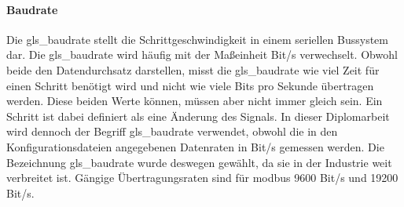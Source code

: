 \paragraph{Baudrate} \label{baud_rate}
Die \gls{gls_baudrate} stellt die Schrittgeschwindigkeit in einem seriellen Bussystem dar. Die \gls{gls_baudrate} wird häufig mit der Maßeinheit Bit/s verwechselt. Obwohl beide den Datendurchsatz darstellen, misst die \gls{gls_baudrate} wie viel Zeit für einen Schritt benötigt wird und nicht wie viele Bits pro Sekunde übertragen werden. Diese beiden Werte können, müssen aber nicht immer gleich sein. Ein Schritt ist dabei definiert als eine Änderung des Signals. 
\cite[vgl.][]{KUNBUS_GmbH_Baudrate:o.J.}
In dieser Diplomarbeit wird dennoch der Begriff \gls{gls_baudrate} verwendet, obwohl die in den Konfigurationsdateien angegebenen Datenraten in Bit/s gemessen werden. Die Bezeichnung \gls{gls_baudrate} wurde deswegen gewählt, da sie in der Industrie weit verbreitet ist. Gängige Übertragungsraten sind für \gls{modbus} 9600 Bit/s und 19200 Bit/s.
